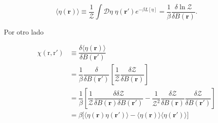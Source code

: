 \documentclass[10pt]{article}
\begin{document}
\begin{equation}
\langle \eta(\mathbf{r})\rangle \equiv \dfrac{1}{\mathcal{Z}} \int \mathcal{D}\eta\; \eta(\mathbf{r'})  e^{-\beta L[\eta]} = \dfrac{1}{\beta} \dfrac{\delta \ln \mathcal{Z}}{\delta B(\mathbf{r})}.
\end{equation}

Por otro lado

\begin{align*}
\chi(\mathrm{r}, \mathrm{r'}) &\equiv \dfrac{\delta \langle \eta(\mathbf{r}) \rangle}{\delta B(\mathbf{r'})} \\
&= \dfrac{1}{\beta} \dfrac{\delta}{\delta B(\mathbf{r'})}\left[ \dfrac{1}{\mathcal{Z}} \dfrac{\delta \mathcal{Z}}{\delta B(\mathbf{r})} \right] \\
&= \dfrac{1}{\beta} \left[ \dfrac{1}{\mathcal{Z}} \dfrac{\delta \delta \mathcal{Z}}{\delta B(\mathbf{r}) \delta B(\mathbf{r'})} - \dfrac{1}{\mathcal{Z}^2} \dfrac{\delta \mathcal{Z}}{\delta B(\mathbf{r})} \dfrac{\delta \mathcal{Z}}{\delta B(\mathbf{r'})}  \right] \\
&= \beta \bigg[ \langle \eta(\mathbf{r})  \eta(\mathbf{r'}) \rangle - \langle  \eta(\mathbf{r}) \rangle \langle  \eta(\mathbf{r'}) \rangle \bigg] 
\end{align*}
\end{document}
